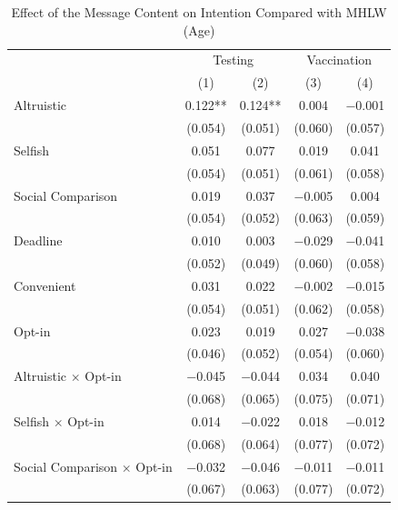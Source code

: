 \documentclass[
]{article}
\begin{document}
\begin{table}

\caption{\label{tab:reg-int-woA}Effect of the Message Content on Intention Compared with MHLW (Age)}
\centering
\fontsize{9}{11}\selectfont
\begin{threeparttable}
\begin{tabular}[t]{lcccc}
\toprule
\multicolumn{1}{c}{ } & \multicolumn{2}{c}{Testing} & \multicolumn{2}{c}{Vaccination} \\
\cmidrule(l{3pt}r{3pt}){2-3} \cmidrule(l{3pt}r{3pt}){4-5}
  & (1) & (2) & (3) & (4)\\
\midrule
Altruistic & \num{0.122}** & \num{0.124}** & \num{0.004} & \num{-0.001}\\
 & (\num{0.054}) & (\num{0.051}) & (\num{0.060}) & (\num{0.057})\\
Selfish & \num{0.051} & \num{0.077} & \num{0.019} & \num{0.041}\\
 & (\num{0.054}) & (\num{0.051}) & (\num{0.061}) & (\num{0.058})\\
Social Comparison & \num{0.019} & \num{0.037} & \num{-0.005} & \num{0.004}\\
 & (\num{0.054}) & (\num{0.052}) & (\num{0.063}) & (\num{0.059})\\
Deadline & \num{0.010} & \num{0.003} & \num{-0.029} & \num{-0.041}\\
 & (\num{0.052}) & (\num{0.049}) & (\num{0.060}) & (\num{0.058})\\
Convenient & \num{0.031} & \num{0.022} & \num{-0.002} & \num{-0.015}\\
 & (\num{0.054}) & (\num{0.051}) & (\num{0.062}) & (\num{0.058})\\
Opt-in & \num{0.023} & \num{0.019} & \num{0.027} & \num{-0.038}\\
 & (\num{0.046}) & (\num{0.052}) & (\num{0.054}) & (\num{0.060})\\
Altruistic $\times$ Opt-in & \num{-0.045} & \num{-0.044} & \num{0.034} & \num{0.040}\\
 & (\num{0.068}) & (\num{0.065}) & (\num{0.075}) & (\num{0.071})\\
Selfish $\times$ Opt-in & \num{0.014} & \num{-0.022} & \num{0.018} & \num{-0.012}\\
 & (\num{0.068}) & (\num{0.064}) & (\num{0.077}) & (\num{0.072})\\
Social Comparison $\times$ Opt-in & \num{-0.032} & \num{-0.046} & \num{-0.011} & \num{-0.011}\\
 & (\num{0.067}) & (\num{0.063}) & (\num{0.077}) & (\num{0.072})\\

\end{tabular}
\end{threeparttable}
\end{table}
\end{document}
